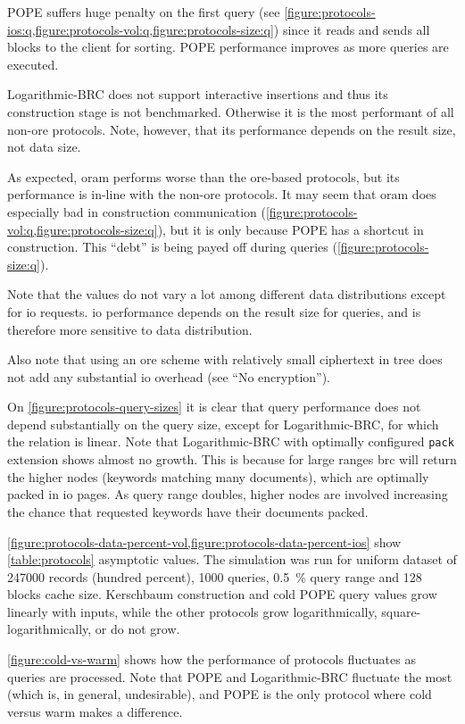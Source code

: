 			POPE suffers huge penalty on the first query (see \cref{figure:protocols-ios:q,figure:protocols-vol:q,figure:protocols-size:q}) since it reads and sends all blocks to the client for sorting.
			POPE performance improves as more queries are executed.

			

			Logarithmic-BRC does not support interactive insertions and thus its construction stage is not benchmarked.
			Otherwise it is the most performant of all non-\acrshort{ore} protocols.
			Note, however, that its performance depends on the result size, not data size.

			As expected, \acrshort{oram} performs worse than the \acrshort{ore}-based protocols, but its performance is in-line with the non-\acrshort{ore} protocols.
			It may seem that \acrshort{oram} does especially bad in construction communication (\cref{figure:protocols-vol:q,figure:protocols-size:q}), but it is only because POPE has a shortcut in construction.
			This ``debt'' is being payed off during queries (\cref{figure:protocols-size:q}).

			Note that the values do not vary a lot among different data distributions except for \acrshort{io} requests.
			\acrshort{io} performance depends on the result size for queries, and is therefore more sensitive to data distribution.

			Also note that using an \acrshort{ore} scheme with relatively small ciphertext in {\BPlus} tree does not add any substantial \acrshort{io} overhead (see ``No encryption'').


			On \cref{figure:protocols-query-sizes} it is clear that query performance does not depend substantially on the query size, except for Logarithmic-BRC, for which the relation is linear.
			Note that Logarithmic-BRC with optimally configured \texttt{pack} extension shows almost no growth.
			This is because for large ranges \acrshort{brc} will return the higher nodes (keywords matching many documents), which are optimally packed in \acrshort{io} pages.
			As query range doubles, higher nodes are involved increasing the chance that requested keywords have their documents packed.


			\cref{figure:protocols-data-percent-vol,figure:protocols-data-percent-ios} show \cref{table:protocols} asymptotic values.
			The simulation was run for uniform dataset of \num{247000} records (hundred percent), \num{1000} queries, \SI{0.5}{\percent} query range and \num{128} blocks cache size.
			Kerschbaum construction  and cold POPE query values grow linearly with inputs, while the other protocols grow logarithmically, square-logarithmically, or do not grow.

			\cref{figure:cold-vs-warm} shows how the performance of protocols fluctuates as queries are processed.
			Note that POPE and Logarithmic-BRC fluctuate the most (which is, in general, undesirable), and POPE is the only protocol where cold versus warm makes a difference.
